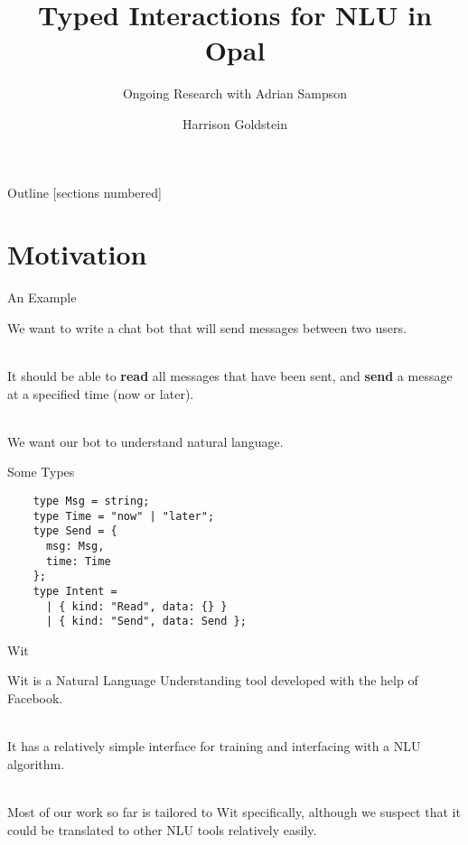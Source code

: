 \documentclass[10pt]{beamer}
\title{Typed Interactions for NLU in Opal}
\subtitle{Ongoing Research with Adrian Sampson}
\date{}
\author{Harrison Goldstein}
\institute{Cornell University}
\begin{document}
\maketitle

\begin{frame}{Outline}
  [sections numbered]
  \tableofcontents[hideallsubsections]
\end{frame}

\section{Motivation}

\begin{frame}[fragile]{An Example}

  We want to write a chat bot that will send messages between two users.

  ~\\
  It should be able to {\bf read} all messages that have been sent, and {\bf
    send} a message at a specified time (now or later).

  ~\\
  We want our bot to understand natural language.
\end{frame}

\begin{frame}[fragile]{Some Types}

  \begin{center}
    \begin{verbatim}
    type Msg = string;
    type Time = "now" | "later";
    type Send = {
      msg: Msg,
      time: Time
    };
    type Intent =
      | { kind: "Read", data: {} }
      | { kind: "Send", data: Send };
    \end{verbatim}
  \end{center}
\end{frame}

\begin{frame}[fragile]{Wit}

  Wit is a Natural Language Understanding tool developed with the help of
  Facebook.

  ~\\
  It has a relatively simple interface for training and interfacing with a NLU
  algorithm.

  ~\\
  Most of our work so far is tailored to Wit specifically, although we suspect
  that it could be translated to other NLU tools relatively easily.
\end{frame}
\end{document}
